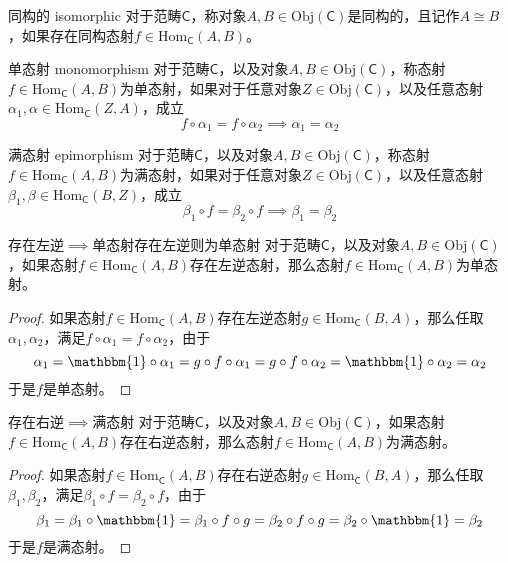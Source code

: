 \documentclass[lang = cn, scheme = chinese, thmcnt = section]{elegantbook}
\begin{document}
\begin{definition}{同构的 isomorphic}
	对于范畴$\mathsf{C}$，称对象$A,B\in\mathrm{Obj}(\mathsf{C})$是同构的，且记作$A\cong B$，如果存在同构态射$f\in\mathrm{Hom}_\mathsf{C}(A,B)$。
\end{definition}

\begin{definition}{单态射 monomorphism}
	对于范畴$\mathsf{C}$，以及对象$A,B\in\mathrm{Obj}(\mathsf{C})$，称态射$f\in\mathrm{Hom}_\mathsf{C}(A,B)$为单态射，如果对于任意对象$Z\in\mathrm{Obj}(\mathsf{C})$，以及任意态射$\alpha_1,\alpha\in\mathrm{Hom}_\mathsf{C}(Z,A)$，成立
	$$
	f\circ \alpha_1=f\circ \alpha_2
	\implies
	\alpha_1=\alpha_2
	$$
\end{definition}

\begin{definition}{满态射 epimorphism}
	对于范畴$\mathsf{C}$，以及对象$A,B\in\mathrm{Obj}(\mathsf{C})$，称态射$f\in\mathrm{Hom}_\mathsf{C}(A,B)$为满态射，如果对于任意对象$Z\in\mathrm{Obj}(\mathsf{C})$，以及任意态射$\beta_1,\beta\in\mathrm{Hom}_\mathsf{C}(B,Z)$，成立
	$$
	\beta_1\circ f=\beta_2\circ f
	\implies
	\beta_1=\beta_2
	$$
\end{definition}

\begin{proposition}{存在左逆$\implies$单态射}{存在左逆则为单态射}
	对于范畴$\mathsf{C}$，以及对象$A,B\in\mathrm{Obj}(\mathsf{C})$，如果态射$f\in\mathrm{Hom}_\mathsf{C}(A,B)$存在左逆态射，那么态射$f\in\mathrm{Hom}_\mathsf{C}(A,B)$为单态射。
\end{proposition}

\begin{proof}
	如果态射$f\in\mathrm{Hom}_\mathsf{C}(A,B)$存在左逆态射$g\in\mathrm{Hom}_\mathsf{C}(B,A)$，那么任取$\alpha_1,\alpha_2$，满足$f\circ \alpha_1=f\circ \alpha_2$，由于
	$$
	\alpha_1=\mathbbm{1}\circ \alpha_1=g\circ f\circ \alpha_1=g\circ f\circ \alpha_2=\mathbbm{1}\circ \alpha_2=\alpha_2
	$$
	于是$f$是单态射。
\end{proof}

\begin{proposition}{存在右逆$\implies$满态射}
	对于范畴$\mathsf{C}$，以及对象$A,B\in\mathrm{Obj}(\mathsf{C})$，如果态射$f\in\mathrm{Hom}_\mathsf{C}(A,B)$存在右逆态射，那么态射$f\in\mathrm{Hom}_\mathsf{C}(A,B)$为满态射。
\end{proposition}

\begin{proof}
	如果态射$f\in\mathrm{Hom}_\mathsf{C}(A,B)$存在右逆态射$g\in\mathrm{Hom}_\mathsf{C}(B,A)$，那么任取$\beta_1,\beta_2$，满足$\beta_1\circ f=\beta_2\circ f$，由于
	$$
	\beta_1=\beta_1\circ \mathbbm{1}=\beta_1\circ f\circ g=\beta_2\circ f\circ g=\beta_2\circ \mathbbm{1}=\beta_2
	$$
	于是$f$是满态射。
\end{proof}
\end{document}
